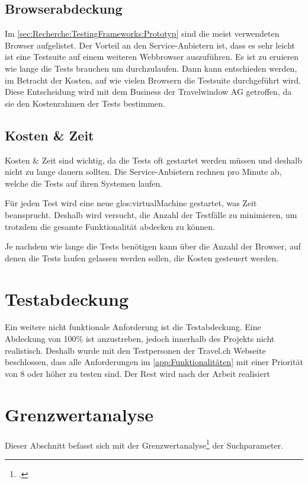 \subsection{Browserabdeckung}
Im \cref{sec:Recherche:TestingFrameworks:Prototyp}  sind die meist verwendeten Browser aufgelistet. Der Vorteil an den Service-Anbietern ist, dass es sehr leicht ist eine Testsuite auf einem weiteren Webbrowser auszuführen. Es ist zu eruieren wie lange die Tests brauchen um durchzulaufen. Dann kann entschieden werden, im Betracht der Kosten, auf wie vielen Browsern die Testsuite durchgeführt wird. Diese Entscheidung wird mit dem Business der Travelwindow AG getroffen, da sie den Kostenrahmen der Tests bestimmen.

\subsection{Kosten \& Zeit}
Kosten \& Zeit sind wichtig, da die Tests oft gestartet werden müssen und deshalb nicht zu lange dauern sollten. Die Service-Anbietern rechnen pro Minute ab, welche die Tests auf ihren Systemen laufen. 

Für jeden Test wird eine neue \Gls{glos:virtualMachine} gestartet, was Zeit beansprucht. Deshalb wird versucht, die Anzahl der Testfälle zu minimieren, um trotzdem die gesamte Funktionalität abdecken zu können.

Je nachdem wie lange die Tests benötigen kann über die Anzahl der Browser, auf denen die Tests laufen gelassen werden sollen, die Kosten gesteuert werden.

\section{Testabdeckung}
\label{sec:analyse:testabdeckung}
Ein weitere nicht funktionale Anforderung ist die Testabdeckung. Eine Abdeckung von 100\% ist anzustreben, jedoch innerhalb des Projekts nicht realistisch. Deshalb wurde mit den Testpersonen der Travel.ch Webseite beschlossen, dass alle Anforderungen im \cref{app:Funktionalitäten}  mit einer Priorität von 8 oder höher zu testen sind. Der Rest wird nach der Arbeit realisiert

\section{Grenzwertanalyse}
\label{sec:analyse:grenzwertanalyse}
Dieser Abschnitt befasst sich mit der Grenzwertanalyse\footcite{Dynamisches_Software-Testverfahren__Wikipedia_2015-10-25} der Suchparameter.

